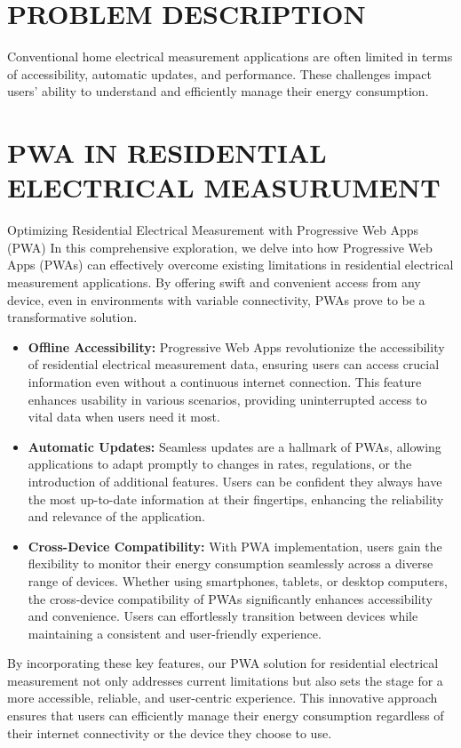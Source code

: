 \documentclass{article}
\begin{document}
\begin{multicols}{2}
\section*{PROBLEM DESCRIPTION}
Conventional home electrical measurement applications are often limited in terms of accessibility, automatic updates, and performance. These challenges impact users' ability to understand and efficiently manage their energy consumption.

\section*{PWA IN RESIDENTIAL ELECTRICAL MEASURUMENT}

Optimizing Residential Electrical Measurement with Progressive Web Apps (PWA)
In this comprehensive exploration, we delve into how Progressive Web Apps (PWAs) can effectively overcome existing limitations in residential electrical measurement applications. By offering swift and convenient access from any device, even in environments with variable connectivity, PWAs prove to be a transformative solution.
\begin{itemize}
    \item \textbf{Offline Accessibility:} Progressive Web Apps revolutionize the accessibility of residential electrical measurement data, ensuring users can access crucial information even without a continuous internet connection. This feature enhances usability in various scenarios, providing uninterrupted access to vital data when users need it most.
    \item \textbf{Automatic Updates:} Seamless updates are a hallmark of PWAs, allowing applications to adapt promptly to changes in rates, regulations, or the introduction of additional features. Users can be confident they always have the most up-to-date information at their fingertips, enhancing the reliability and relevance of the application.
    \item \textbf{Cross-Device Compatibility:} With PWA implementation, users gain the flexibility to monitor their energy consumption seamlessly across a diverse range of devices. Whether using smartphones, tablets, or desktop computers, the cross-device compatibility of PWAs significantly enhances accessibility and convenience. Users can effortlessly transition between devices while maintaining a consistent and user-friendly experience.
\end{itemize}
By incorporating these key features, our PWA solution for residential electrical measurement not only addresses current limitations but also sets the stage for a more accessible, reliable, and user-centric experience. This innovative approach ensures that users can efficiently manage their energy consumption regardless of their internet connectivity or the device they choose to use.


\end{multicols}
\end{document}
